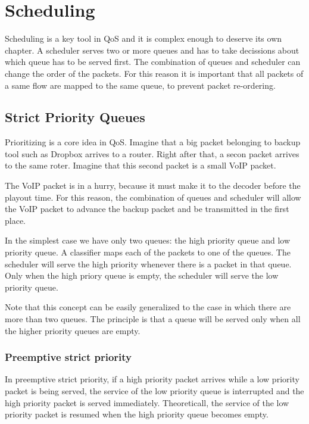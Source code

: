 \chapter{Scheduling}

Scheduling is a key tool in QoS and it is complex enough to deserve its own chapter.
A scheduler serves two or more queues and has to take decissions about which queue has to be served first.
The combination of queues and scheduler can change the order of the packets.
For this reason it is important that all packets of a same flow are mapped to the same queue, to prevent packet re-ordering.

\section{Strict Priority Queues}

Prioritizing is a core idea in QoS.
Imagine that a big packet belonging to backup tool such as Dropbox arrives to a router.
Right after that, a secon packet arrives to the same roter.
Imagine that this second packet is a small VoIP packet.

The VoIP packet is in a hurry, because it must make it to the decoder before the playout time.
For this reason, the combination of queues and scheduler will allow the VoIP packet to advance the backup packet and be transmitted in the first place.

In the simplest case we have only two queues: the high priority queue and low priority queue.
A classifier maps each of the packets to one of the queues.
The scheduler will serve the high priority whenever there is a packet in that queue.
Only when the high priory queue is empty, the scheduler will serve the low priority queue.

Note that this concept can be easily generalized to the case in which there are more than two queues.
The principle is that a queue will be served only when all the higher priority queues are empty.

\subsection{Preemptive strict priority}
In preemptive strict priority, if a high priority packet arrives while a low priority packet is being served, the service of the low priority queue is interrupted and the high priority packet is served immediately.
Theoreticall, the service of the low priority packet is resumed when the high priority queue becomes empty.

